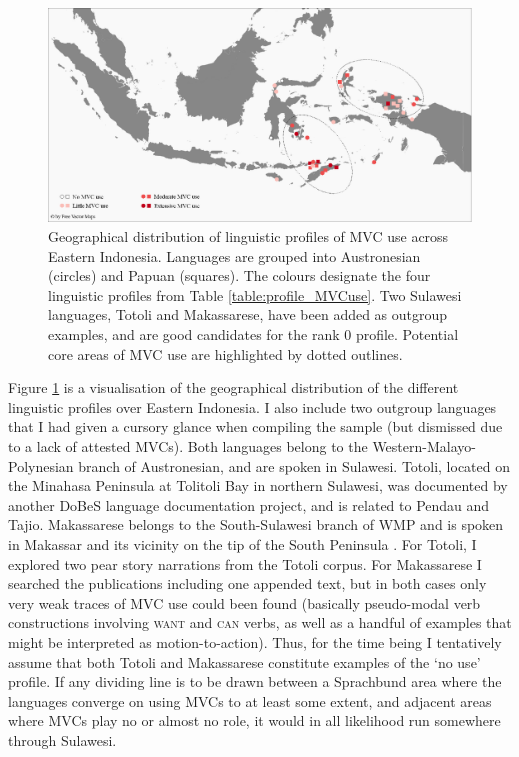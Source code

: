 \begin{figure}
\includegraphics[width=\textwidth]{figures/Map_overview_klein_MVCuse_alt.eps}
\caption[Geographical distribution of linguistic profiles of MVC use across Eastern Indonesia]{Geographical distribution of linguistic profiles of MVC use across Eastern Indonesia. Languages are grouped into Austronesian (circles) and Papuan (squares). The colours designate the four linguistic profiles from Table \ref{table:profile_MVCuse}. Two Sulawesi languages, Totoli and Makassarese, have been added as outgroup examples, and are good candidates for the rank 0 profile. Potential core areas of MVC use are highlighted by dotted outlines.}\label{fig:map_profiles}
\end{figure}

Figure \ref{fig:map_profiles} is a visualisation of the geographical distribution of the different linguistic profiles over Eastern Indonesia. I also include two outgroup languages that I had given a cursory glance when compiling the sample (but dismissed due to a lack of attested MVCs). Both languages belong to the Western-Malayo-Polynesian branch of Austronesian, and are spoken in Sulawesi. Totoli, located on the Minahasa Peninsula at Tolitoli Bay in northern Sulawesi, was documented by another DoBeS language documentation project\citep{leto2012totoli}, and is related to Pendau and Tajio. Makassarese belongs to the South-Sulawesi branch of WMP and is spoken in Makassar and its vicinity on the tip of the South Peninsula \citep{jukes2005makassar, jukes2006makassarese}. For Totoli, I explored two pear story narrations from the Totoli corpus. For Makassarese I searched the publications including one appended text, but in both cases only very weak traces of MVC use could been found (basically pseudo-modal verb constructions involving \textsc{want} and \textsc{can} verbs, as well as a handful of examples that might be interpreted as motion-to-action). Thus, for the time being I tentatively assume that both Totoli and Makassarese constitute examples of the `no use' profile. If any dividing line is to be drawn between a Sprachbund area where the languages converge on using MVCs to at least some extent, and adjacent areas where MVCs play no or almost no role, it would in all likelihood run somewhere through Sulawesi.

